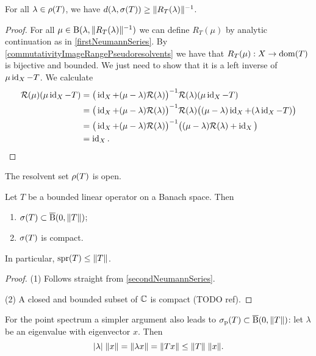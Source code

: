 \begin{proposition} \label{resolventNormDistanceToSpectrum}
For all $\lambda\in\rho(T)$, we have $d(\lambda, \sigma(T)) \geq \lVert R_T(\lambda)\rVert^{-1}$.
\end{proposition}
\begin{proof}
For all $\mu\in \operatorname{B}(\lambda, \lVert R_T(\lambda)\rVert^{-1})$ we can define $R_T(\mu)$ by analytic continuation as in \ref{firstNeumannSeries}. By \ref{commutativityImageRangePseudoresolvents} we have that $R_T(\mu): X\to \operatorname{dom}(T)$ is bijective and bounded. We just need to show that it is a left inverse of $\mu\operatorname{id}_X - T$. We calculate
\begin{align*}
\mathcal{R}(\mu)(\mu\operatorname{id}_X - T) &= \big(\operatorname{id}_X + (\mu - \lambda)\mathcal{R}(\lambda)\big)^{-1}\mathcal{R}(\lambda)(\mu\operatorname{id}_X - T) \\
&= \big(\operatorname{id}_X + (\mu - \lambda)\mathcal{R}(\lambda)\big)^{-1}\mathcal{R}(\lambda)\big((\mu - \lambda)\operatorname{id}_X + (\lambda\operatorname{id}_X - T)\big) \\
&= \big(\operatorname{id}_X + (\mu - \lambda)\mathcal{R}(\lambda)\big)^{-1}\big((\mu - \lambda)\mathcal{R}(\lambda) + \operatorname{id}_X\big) \\
&= \operatorname{id}_X.
\end{align*}
\end{proof}
\begin{corollary}
The resolvent set $\rho(T)$ is open.
\end{corollary}
\begin{corollary}
Let $T$ be a bounded linear operator on a Banach space. Then
\begin{enumerate}
\item $\sigma(T)\subset \operatorname{\overline{B}}(0, \lVert T\rVert)$;
\item $\sigma(T)$ is compact.
\end{enumerate}
In particular, $\operatorname{spr}(T)\leq \lVert T\rVert$.
\end{corollary}
\begin{proof}
(1) Follows straight from \ref{secondNeumannSeries}.

(2) A closed and bounded subset of $\mathbb{C}$ is compact (TODO ref).
\end{proof}

For the point spectrum a simpler argument also leads to $\sigma_\text{p}(T)\subset \operatorname{\overline{B}}(0, \lVert T\rVert)$: let $\lambda$ be an eigenvalue with eigenvector $x$. Then
\[ |\lambda|\;\lVert x\rVert = \lVert\lambda x\rVert = \lVert Tx\rVert \leq \lVert T\rVert\;\lVert x\rVert. \]


